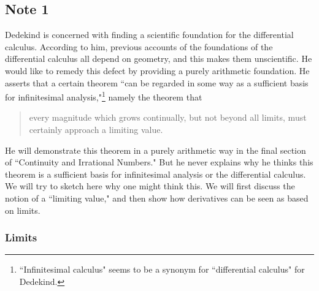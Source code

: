 \documentclass[polutonikogreek,english,twoside,openright]{article}
\begin{document}
\subsection*{Note 1}\label{note1}

Dedekind is concerned with finding a scientific foundation for the
differential calculus.  According to him, previous accounts of the
foundations of the differential calculus all depend on geometry, and
this makes them unscientific.  He would like to remedy this defect by
providing a purely arithmetic foundation.  He asserts that a certain
theorem ``can be regarded in some way as a sufficient basis for
infinitesimal analysis,"\footnote{``Infinitesimal calculus" seems to
  be a synonym for ``differential calculus" for Dedekind.} namely the
theorem that
\begin{quote}
  every magnitude which grows continually, but not beyond all limits,
  must certainly approach a limiting value.
\end{quote}
He will demonstrate this theorem in a purely arithmetic way in the
final section of ``Continuity and Irrational Numbers."  But he never
explains why he thinks this theorem is a sufficient basis for
infinitesimal analysis or the differential calculus.  We will try to
sketch here why one might think this.  We will first discuss the
notion of a ``limiting value," and then show how derivatives can be
seen as based on limits.

\subsubsection*{Limits}
\end{document}

